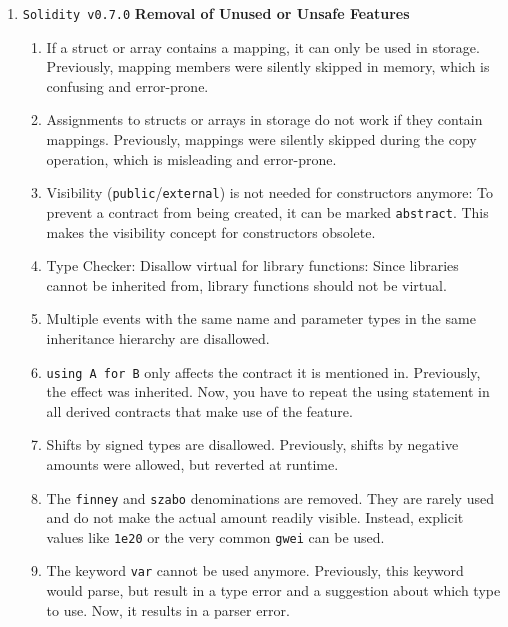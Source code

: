 \begin{enumerate}
\item \verb|Solidity v0.7.0| \textbf{Removal of Unused or Unsafe Features}
    \begin{enumerate}
	\item If a struct or array contains a mapping, it can only be used in storage. Previously, mapping members were silently skipped in memory, which is confusing and error-prone.
	\item Assignments to structs or arrays in storage do not work if they contain mappings. Previously, mappings were silently skipped during the copy operation, which is misleading and error-prone.
	\item Visibility (\verb|public|/\verb|external|) is not needed for constructors anymore: To prevent a contract from being created, it can be marked \verb|abstract|. This makes the visibility concept for constructors obsolete.
	\item Type Checker: Disallow virtual for library functions: Since libraries cannot be inherited from, library functions should not be virtual.
	\item Multiple events with the same name and parameter types in the same inheritance hierarchy are disallowed.
	\item\verb|using A for B| only affects the contract it is mentioned in. Previously, the effect was inherited. Now, you have to repeat the using statement in all derived contracts that make use of the feature.
	\item Shifts by signed types are disallowed. Previously, shifts by negative amounts were allowed, but reverted at runtime.
	\item The \verb|finney| and \verb|szabo| denominations are removed. They are rarely used and do not make the actual amount readily visible. Instead, explicit values like \verb|1e20| or the very common \verb|gwei| can be used.
	\item The keyword \verb|var| cannot be used anymore. Previously, this keyword would parse, but result in a type error and a suggestion about which type to use. Now, it results in a parser error.
    \end{enumerate}


\end{enumerate}
